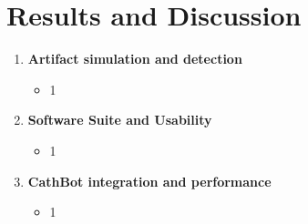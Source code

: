 \chapter{Results and Discussion}
\label{ch:discussion}

\begin{enumerate}
    \item \textbf{Artifact simulation and detection}
    \begin{itemize} 
        \item 1
    \end{itemize}

    \item \textbf{Software Suite and Usability}
    \begin{itemize} 
        \item 1
    \end{itemize}

    \item \textbf{CathBot integration and performance}
    \begin{itemize} 
        \item 1
    \end{itemize}
\end{enumerate}
